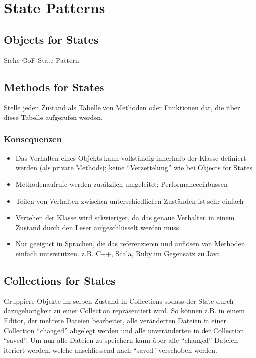 \section{State Patterns}

\subsection{Objects for States}

Siehe GoF State Pattern

\subsection{Methods for States}

Stelle jeden Zustand als Tabelle von Methoden oder Funktionen dar, die über diese Tabelle aufgerufen werden.

\subsubsection*{Konsequenzen}

\begin{itemize}
	\item Das Verhalten eines Objekts kann vollständig innerhalb der Klasse definiert werden (als private Methods); keine ``Verzettelung'' wie bei Objects for States
	\item Methodenaufrufe werden zusätzlich umgeleitet; Performanceeinbussen
	\item Teilen von Verhalten zwischen unterschiedlichen Zuständen ist sehr einfach
	\item Vertehen der Klasse wird schwieriger, da das genaue Verhalten in einem Zustand durch den Leser aufgeschlüsselt werden muss
	\item Nur geeignet in Sprachen, die das referenzieren und auflösen von Methoden einfach unterstützen. z.B. C++, Scala, Ruby im Gegensatz zu Java
\end{itemize}

\subsection{Collections for States}

Gruppiere Objekte im selben Zustand in Collections sodass der State durch dazugehörigkeit zu einer Collection repräsentiert wird. So können z.B. in einem Editor, der mehrere Dateien bearbeitet, alle veränderten Dateien in einer Collection ``changed'' abgelegt werden und alle unveränderten in der Collection ``saved''. Um nun alle Dateien zu speichern kann über alle ``changed'' Dateien iteriert werden, welche anschliessend nach ``saved'' verschoben werden.

